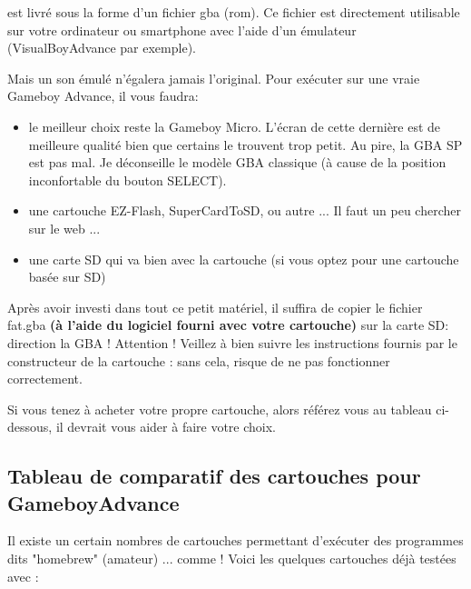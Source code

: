 \FAT est livré sous la forme d'un fichier gba (rom).
Ce fichier est directement utilisable sur votre ordinateur ou smartphone avec l'aide d'un émulateur (VisualBoyAdvance par exemple).
\medskip

Mais un son émulé n'égalera jamais l'original.
Pour exécuter \FAT sur une vraie Gameboy Advance, il vous faudra:
\begin{itemize}
  \item{le meilleur choix reste la Gameboy Micro. L'écran de cette dernière est de meilleure qualité bien que certains le trouvent trop petit. Au pire, la GBA SP est pas mal. Je déconseille le modèle GBA classique (à cause de la position inconfortable du bouton SELECT).}
  \item{une cartouche EZ-Flash, SuperCardToSD, ou autre ... Il faut un peu chercher sur le web ...}
  \item{une carte SD qui va bien avec la cartouche (si vous optez pour une cartouche basée sur SD)}
\end{itemize}\medskip

Après avoir investi dans tout ce petit matériel, il suffira de copier le fichier fat.gba {\bf (à l'aide du logiciel fourni avec votre cartouche)} sur la carte SD: direction la GBA !
Attention ! Veillez à bien suivre les instructions fournis par le constructeur de la cartouche : sans cela, \FAT risque de ne pas fonctionner correctement.


Si vous tenez à acheter votre propre cartouche, alors référez vous au tableau ci-dessous, il devrait vous aider à faire votre choix.

\subsection{Tableau de comparatif des cartouches pour GameboyAdvance}

Il existe un certain nombres de cartouches permettant d'exécuter des programmes dits "homebrew" (amateur) ... comme \FAT !
Voici les quelques cartouches déjà testées avec \FAT :
\medskip

